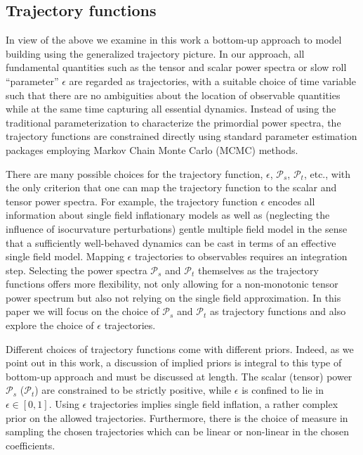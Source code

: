 \documentclass[a4paper,11pt]{article}
\newcommand{\pscalar}{{\mathcal{P}_s}}
\newcommand{\ptensor}{{\mathcal{P}_t}}
\begin{document}
\subsection{Trajectory functions}
In view of the above we examine in this work a bottom-up approach to
model building using the generalized trajectory picture. In our
approach, all fundamental quantities such as the tensor and scalar
power spectra or slow roll ``parameter'' $\epsilon$ are regarded as
trajectories, with a suitable choice of time variable such that there
are no ambiguities about the location of observable quantities while
at the same time capturing all essential dynamics. Instead of using
the traditional parameterization to characterize the primordial power
spectra, the trajectory functions are constrained directly using
standard parameter estimation packages employing Markov Chain Monte
Carlo (MCMC) methods. 

There are many possible choices for the trajectory function,
$\epsilon$, $\pscalar$, $\ptensor$, etc., with the only
criterion that one can map the trajectory function to the scalar and
tensor power spectra. For example, the trajectory function $\epsilon$
encodes all information about single field inflationary models as well
as (neglecting the influence of isocurvature perturbations) gentle
multiple field model in the sense that a sufficiently well-behaved
dynamics can be cast in terms of an effective single field
model. Mapping $\epsilon$ trajectories to observables requires an
integration step. Selecting the power spectra $\pscalar$ and
$\ptensor$ themselves as the trajectory functions offers more
flexibility, not only allowing for a non-monotonic tensor power
spectrum but also not relying on the single field approximation.  In
this paper we will focus on the choice of $\pscalar$ and
$\ptensor$ as trajectory functions and also explore the choice of
$\epsilon$ trajectories.

Different choices of trajectory functions come with different
priors. Indeed, as we point out in this work, a discussion of implied
priors is integral to this type of bottom-up approach and must be
discussed at length. The scalar (tensor) power $\pscalar$
($\ptensor$) are constrained to be strictly positive, while
$\epsilon$ is confined to lie in $\epsilon\in[0,1]$. Using $\epsilon$
trajectories implies single field inflation, a rather complex prior on
the allowed trajectories. Furthermore, there is the choice of measure
in sampling the chosen trajectories which can be linear or non-linear
in the chosen coefficients.
\end{document}

